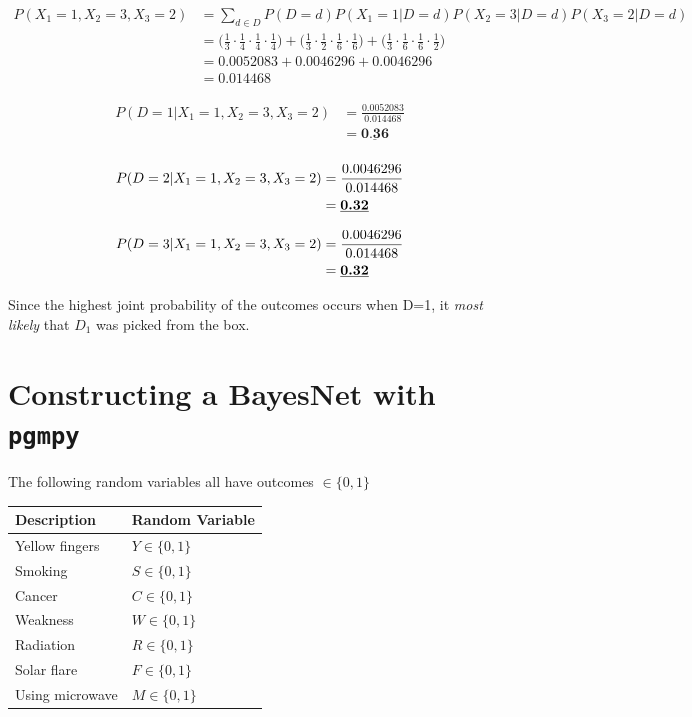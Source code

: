 \documentclass[12pt, letterpaper]{article}
\begin{document}
\begin{align*}
P(X_1=1,X_2=3,X_3=2)    &= \sum_{d\in D}{P(D=d)P(X_1=1|D=d)P(X_2=3|D=d)P(X_3=2|D=d)}\\
                        &= \bigg( \frac{1}{3}\cdot\frac{1}{4}\cdot\frac{1}{4}\cdot\frac{1}{4}\bigg) + \bigg(\frac{1}{3}\cdot\frac{1}{2}\cdot\frac{1}{6}\cdot\frac{1}{6}\bigg)+\bigg(\frac{1}{3}\cdot\frac{1}{6}\cdot\frac{1}{6}\cdot\frac{1}{2}\bigg)\\
                        &= 0.0052083+0.0046296+0.0046296\\
                        &= 0.014468
\end{align*}

\begin{align*}
P(D=1|X_1=1,X_2=3,X_3=2)    &= \frac{0.0052083}{0.014468}\\ 
                            &= \underline{\textbf{0.36}}\\                            
\end{align*}

\begin{align*} 
P(D=2|X_1=1,X_2=3,X_3=2)    &= \frac{0.0046296}{0.014468}\\ 
                            &= \textbf{\underline{0.32}}
\end{align*}

\begin{align*} 
P(D=3|X_1=1,X_2=3,X_3=2)    &= \frac{0.0046296}{0.014468}\\ 
                            &= \textbf{\underline{0.32}}
\end{align*}

Since the highest joint probability of the outcomes occurs when D=1, it \textit{most likely} that \textbf{$D_1$} was picked from the box.

\clearpage

\section{Constructing a BayesNet with \texttt{pgmpy}}

The following random variables all have outcomes $\in \{0,1\}$

\begin{tabular}{ll}
\textbf{Description}   & \textbf{Random Variable}\\
\hline
Yellow fingers&$Y\in \{0,1\}$\\
Smoking&$S\in \{0,1\}$\\
Cancer&$C\in \{0,1\}$\\
Weakness&$W\in \{0,1\}$\\
Radiation&$R\in \{0,1\}$\\
Solar flare&$F\in \{0,1\}$\\
Using microwave&$M\in \{0,1\}$\\
\end{tabular}
\end{document}
